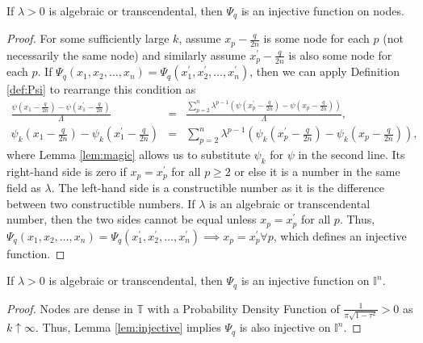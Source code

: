 \begin{lemma}
  \label{lem:injective}
  \leanok
  If $\lambda > 0$ is algebraic or transcendental, then $\Psi_q$ is an injective function on nodes.
\end{lemma}
\begin{proof}
  \leanok
  For some sufficiently large $k$, assume $x_p - \frac{q}{2n}$ is some node for each $p$ (not necessarily the same node) and similarly assume $x_p^\prime - \frac{q}{2n}$ is also some node for each $p$. If $\Psi_q\left(x_1, x_2, \dots, x_n\right) = \Psi_q\left(x_1^\prime, x_2^\prime, \dots, x_n^\prime\right)$, then we can apply Definition \ref{def:Psi} to rearrange this condition as
  \begin{eqnarray*}
      \frac{\psi\left(x_1 - \frac{q}{2n}\right) - \psi\left(x_1^\prime - \frac{q}{2n}\right)}{\Lambda} &=& \frac{\sum\limits_{p = 2}^n\lambda^{p - 1} \left(\psi\left(x_p^\prime - \frac{q}{2n}\right) - \psi\left(x_p - \frac{q}{2n}\right)\right)}{\Lambda}, \\
      \psi_k\left(x_1 - \frac{q}{2n}\right) - \psi_k\left(x_1^\prime - \frac{q}{2n}\right) &=& \sum\limits_{p = 2}^n\lambda^{p - 1} \left(\psi_k\left(x_p^\prime - \frac{q}{2n}\right) - \psi_k\left(x_p - \frac{q}{2n}\right)\right),
  \end{eqnarray*}
  where Lemma \ref{lem:magic} allows us to substitute $\psi_k$ for $\psi$ in the second line. Its right-hand side is zero if $x_p = x_p^\prime$ for all $p \geq 2$ or else it is a number in the same field as $\lambda$. The left-hand side is a constructible number as it is the difference between two constructible numbers. If $\lambda$ is an algebraic or transcendental number, then the two sides cannot be equal unless $x_p = x_p^\prime$ for all $p$. Thus, $\Psi_q\left(x_1, x_2, \dots, x_n\right) = \Psi_q\left(x_1^\prime, x_2^\prime, \dots, x_n^\prime\right) \implies x_p = x_p^\prime \forall p$, which defines an injective function.
\end{proof}

\begin{proposition}
  \label{prop:injective}
  \leanok
  If $\lambda > 0$ is algebraic or transcendental, then $\Psi_q$ is an injective function on $\mathbb{I}^n$.
\end{proposition}
\begin{proof}
  Nodes are dense in $\mathbb{T}$ with a Probability Density Function of $\frac{1}{\pi \sqrt{1 - \tau^2}} > 0$ as $k \uparrow \infty$. Thus, Lemma \ref{lem:injective} implies $\Psi_q$ is also injective on $\mathbb{I}^n$.
\end{proof}

